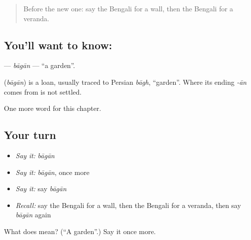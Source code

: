 \label{lesson:BN-C112-bagan}



\begin{quote}
Before the new one: say the Bengali for a wall, then the Bengali for a veranda.
\end{quote}

\subsection*{You'll want to know: }
\textbf{} — \emph{bāgān} — \textquotedblleft{}a garden\textquotedblright{}.

\begin{cousinweb}
\textbf{} (\emph{bāgān}) is a loan, usually traced to Persian \emph{bāgh}, \textquotedblleft{}garden\textquotedblright{}. Where its ending \emph{-ān} comes from is not settled.
\end{cousinweb}

\begin{grammarlens}[title={What you've built}]
One more word for this chapter.
\end{grammarlens}

\subsection*{Your turn}
\begin{itemize}
\raggedright
  \item \emph{Say it:} \emph{bāgān}
  \item \emph{Say it:} \emph{bāgān}, once more
  \item \emph{Say it:} say \emph{bāgān}
  \item \emph{Recall:} say the Bengali for a wall, then the Bengali for a veranda, then say \emph{bāgān} again
\end{itemize}

\begin{tcolorbox}[breakable,colback=teal!4,colframe=teal!35!black,title={Before you move on}]
What does  mean? (\textquotedblleft{}A garden\textquotedblright{}.) Say it once more.
\end{tcolorbox}
